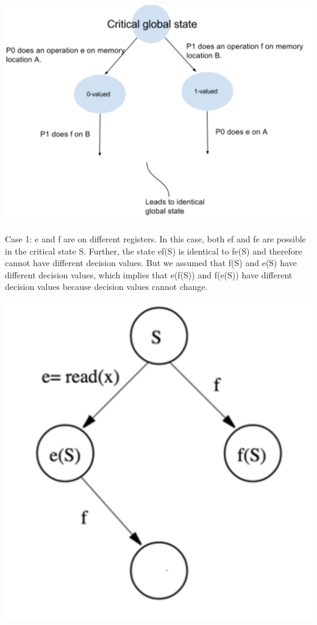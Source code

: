 \documentclass[twoside]{article}
\begin{document}
\centerline{\includegraphics{case1.png}}

Case 1: e and f are on diﬀerent registers. In this case, both ef and fe are possible in the critical state S. Further, the state ef(S) is identical to fe(S) and therefore cannot have diﬀerent decision values. But we assumed that f(S) and e(S) have diﬀerent decision values, which implies that e(f(S)) and f(e(S)) have diﬀerent decision values because decision values cannot change.

\centerline{\includegraphics{case2.png}}
\end{document}

